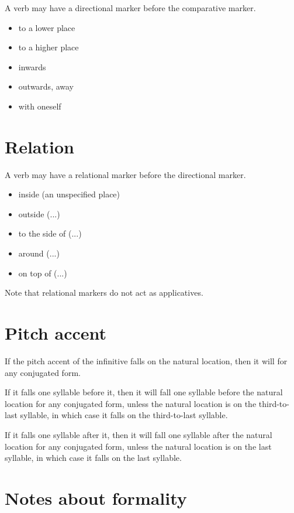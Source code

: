\documentclass{book}
\begin{document}
A verb may have a directional marker before the comparative marker.

\begin{itemize}
    \item {} to a lower place
    \item {} to a higher place
    \item {} inwards
    \item {} outwards, away
    \item {} with oneself
\end{itemize}

\section{Relation}

A verb may have a relational marker before the directional marker.

\begin{itemize}
    \item {} inside (an unspecified place)
    \item {} outside (...)
    \item {} to the side of (...)
    \item {} around (...)
    \item {} on top of (...)
\end{itemize}

Note that relational markers do not act as applicatives.

\section{Pitch accent}

If the pitch accent of the infinitive falls on the natural location, then it will for any conjugated form.

If it falls one syllable before it, then it will fall one syllable before the natural location for any conjugated form, unless the natural location is on the third-to-last syllable, in which case it falls on the third-to-last syllable.

If it falls one syllable after it, then it will fall one syllable after the natural location for any conjugated form, unless the natural location is on the last syllable, in which case it falls on the last syllable.

\section{Notes about formality}
\end{document}
